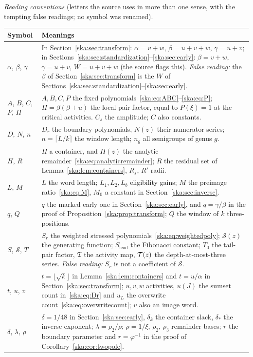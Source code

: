 \documentclass[11pt,letterpaper]{article}
\theoremstyle{definition}
\newcommand{\cS}{\mathcal S}\newcommand{\cU}{\mathcal U}
\begin{document}
\medskip
\begingroup\small
\noindent\emph{Reading conventions} (letters the source uses in more than one
sense, with the tempting false readings; no symbol was renamed).\par\smallskip
\renewcommand{\arraystretch}{1.1}
\noindent\begin{tabular}{@{}>{\raggedright\arraybackslash}p{0.95in}>{\raggedright\arraybackslash}p{5.3in}@{}}
\toprule
Symbol & Meanings\\
\midrule
$\alpha$, $\beta$, $\gamma$ & In Section~\ref{ska:sec:transform}: $\alpha=v+w$, $\beta=u+v+w$, $\gamma=u+v$; in Sections~\ref{ska:sec:standardization}--\ref{ska:sec:early}: $\beta=v+w$, $\gamma=u+v$, $W=u+v+w$ (the source flags this). \emph{False reading:} the $\beta$ of Section~\ref{ska:sec:transform} is the $W$ of Sections~\ref{ska:sec:standardization}--\ref{ska:sec:early}.\\
$A$, $B$, $C$, $P$, $\Pi$ & $A,B,C,P$ the fixed polynomials~\eqref{ska:eq:ABC}--\eqref{ska:eq:P}; $\Pi=\beta(\beta+u)$ the local pair factor, equal to $P(\xi)=1$ at the critical activities. $C_s$ the amplitude; $C$ also constants.\\
$D$, $N$, $n$ & $D_r$ the boundary polynomials, $N(z)$ their numerator series; $n=\lceil L/k\rceil$ the window length; $n_g$ all semigroups of genus $g$.\\
$H$, $R$ & $H$ a container, and $H(z)$ the analytic remainder~\eqref{ska:eq:analyticremainder}; $R$ the residual set of Lemma~\ref{ska:lem:containers}, $R_s$, $R'$ radii.\\
$L$, $M$ & $L$ the word length; $L_1,L_2,L_b$ eligibility gains; $M$ the preimage ratio~\eqref{ska:eq:M}, $M_0$ a constant in Section~\ref{ska:sec:inverse}.\\
$q$, $Q$ & $q$ the marked early one in Section~\ref{ska:sec:early}, and $q=\gamma/\beta$ in the proof of Proposition~\ref{ska:prop:transform}; $Q$ the window of $k$ three-positions.\\
$S$, $\cS$, $T$ & $S_r$ the weighted stressed polynomials~\eqref{ska:eq:weightedpoly}; $\cS(z)$ the generating function; $S_{\mathrm{lead}}$ the Fibonacci constant; $T_0$ the tail-pair factor, $\mathfrak T$ the activity map, $\mathcal T(z)$ the depth-at-most-three series. \emph{False reading:} $S_r$ is not a coefficient of $\cS$.\\
$t$, $u$, $v$ & $t=\lfloor\sqrt k\rfloor$ in Lemma~\ref{ska:lem:containers} and $t=u/\alpha$ in Section~\ref{ska:sec:transform}; $u,v,w$ activities, $u(J)$ the sumset count in~\eqref{ska:eq:Dr} and $u_L$ the overwrite count~\eqref{ska:eq:overwritecount}; $v$ also an image word.\\
$\delta$, $\lambda$, $\rho$ & $\delta=1/48$ in Section~\ref{ska:sec:early}, $\delta_k$ the container slack, $\delta_*$ the inverse exponent; $\lambda=\rho_2/\rho$; $\rho=1/\xi$, $\rho_2$, $\rho_3$ remainder bases; $r$ the boundary parameter and $r=\varphi^{-1}$ in the proof of Corollary~\ref{ska:cor:twopole}.\\
\bottomrule
\end{tabular}
\end{document}
